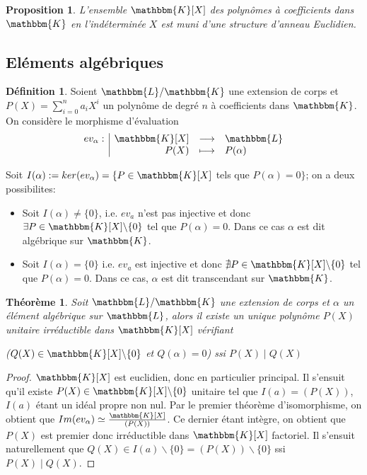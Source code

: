 \documentclass[12pt]{article}
\newcommand{\jL}{\mathbbm{L}}
\newcommand{\K}{\mathbbm{K}}
\newcommand{\fonction}[5]{
\begin{displaymath}
\begin{array}{l|rcl}
\displaystyle
#1 : & #2 & \longrightarrow & #3 \\
    & #4 & \longmapsto & #5
\end{array}
\end{displaymath}
}
\newtheorem{prop}{Proposition}
\newtheorem{thm}{Théorème}
\theoremstyle{definition}\newtheorem{defn}{Définition}
\theoremstyle{definition}\newtheorem{exm}{Exemple}
\theoremstyle{definition}\newtheorem{rem}{Remarque}
\theoremstyle{definition}\newtheorem{algo}{Algorithme}
\theoremstyle{remark}\newtheorem{exo}{Exercice}
\theoremstyle{remark}\newtheorem{nota}{Notation}
\begin{document}
\begin{prop}
L'ensemble $\K[X]$ des polynômes à coefficients dans $\K$ en l'indéterminée $X$ est muni d'une structure d'anneau Euclidien.
\end{prop}


\subsection{Eléments algébriques}

\begin{defn}
Soient $\jL/\K$ une extension de corps et $P(X) = \displaystyle\sum_{i=0}^{n}a_iX^i$ un polynôme de degré $n$ à coefficients dans $\K$. On considère le morphisme d'évaluation \fonction{ev_\alpha}{\K[X]}{\jL}{P(X)}{P(\alpha)}
Soit $I(\alpha) :=  ker(ev_\alpha) = \{ P \in \K[X]$ tels que $P(\alpha) = 0\}$; on a deux possibilites:

\begin{itemize}
	\item Soit $I(\alpha) \ne \{ 0 \}$, i.e. $ev_a$ n'est pas injective et donc $\exists P \in \K[X]\backslash\{0\}$ tel que $P(\alpha) = 0$. \newline
Dans ce cas $\alpha$ est dit algébrique sur $\K$.
	\item Soit $I(\alpha) = \{ 0 \}$ i.e. $ev_a$ est injective et donc $\nexists P \in \K[X]\backslash\{0\}$ tel que $P(\alpha) = 0$. \newline
Dans ce cas, $\alpha$ est dit transcendant sur $\K$.
\end{itemize}
\end{defn}


\begin{thm}
Soit $\jL / \K$ une extension de corps et $\alpha$ un élément algébrique sur $\jL$, alors il existe un unique polynôme $P(X)$ unitaire irréductible dans $\K[X]$ vérifiant
\begin{center} ($Q(X) \in \K[X]\backslash\{0\}$ et $Q(\alpha)=0$) ssi $P(X) \mid Q(X)$\end{center}
\end{thm}

\begin{proof}
$\K[X]$ est euclidien, donc en particulier principal. Il s'ensuit qu'il existe $P(X) \in \K[X]\backslash\{0\}$ unitaire tel que $I(a) = (P(X))$, $I(a)$ étant un idéal propre non nul. Par le premier théorème d'isomorphisme, on obtient que $Im(ev_\alpha) \simeq \frac{\K[X]}{(P(X))}$. \newline
Ce dernier étant intègre, on obtient que $P(X)$ est premier donc irréductible dans $\K[X]$ factoriel. \newline
Il s'ensuit naturellement que $Q(X) \in I(a)\backslash\{0\} = (P(X))\backslash\{0\}$ ssi $P(X) \mid Q(X)$.
\end{proof}
\end{document}
